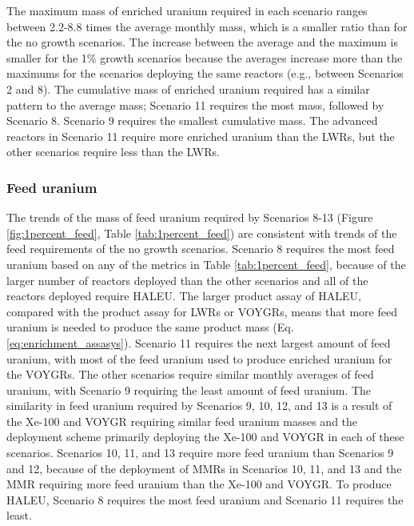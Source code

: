 The maximum mass of enriched uranium required in each scenario ranges 
between 2.2-8.8 times the average monthly mass, which is a smaller ratio 
than for the no growth scenarios. The increase between 
the average and the maximum is smaller for the 1\% growth scenarios because
the averages increase more than the maximums for the scenarios deploying the 
same reactors (e.g., between Scenarios 2 and 8). The cumulative mass 
of enriched uranium required has a similar pattern to the average mass;
Scenario 11 requires the most mass, followed by Scenario 8. Scenario 
9 requires the smallest cumulative mass. 
The advanced reactors in Scenario 11 require more enriched uranium 
than the \glspl{LWR}, but the other scenarios require less than the 
\glspl{LWR}. 

 

\subsubsection{Feed uranium}
The trends of the mass of feed uranium required by Scenarios 8-13 
(Figure \ref{fig:1percent_feed},
Table \ref{tab:1percent_feed}) are consistent with trends of the feed 
requirements of the no growth scenarios. Scenario 8 requires the 
most feed uranium based on any of the metrics in Table 
\ref{tab:1percent_feed}, because of the larger number of 
reactors deployed than the other scenarios and all of the reactors deployed 
require \gls{HALEU}. The larger product assay of \gls{HALEU}, compared with 
the product assay for \glspl{LWR} or VOYGRs, means that more 
feed uranium is needed to produce the same product mass (Eq. 
\ref{eq:enrichment_assasys}). Scenario 11 requires the next largest amount 
of feed uranium, with most of the feed uranium used to produce enriched 
uranium for the VOYGRs. The other scenarios require similar monthly 
averages of feed uranium, with Scenario 9 requiring the least amount of 
feed uranium. The similarity in feed uranium required by Scenarios 9, 10, 12, 
and 13 is a result of the Xe-100 and VOYGR requiring similar feed uranium masses 
and the deployment scheme primarily deploying the Xe-100 and VOYGR in each of 
these scenarios. Scenarios 10, 11, and 13 require more feed 
uranium than Scenarios 9 and 12, because of the deployment of \glspl{MMR} 
in Scenarios 10, 11, and 13 and the \gls{MMR} requiring more feed uranium than 
the Xe-100 and VOYGR. To produce \gls{HALEU}, Scenario 8 requires the most 
feed uranium and Scenario 11 requires the least.  

